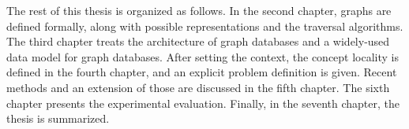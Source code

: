 The rest of this thesis is organized as follows.
In the second chapter, graphs are defined formally, along with possible representations and the traversal algorithms.
The third chapter treats the architecture of graph databases and a widely-used data model for graph databases.
After setting the context, the concept locality is defined in the fourth chapter, and an explicit problem definition is given.
Recent methods and an extension of those are discussed in the fifth chapter.
The sixth chapter presents the experimental evaluation.
Finally, in the seventh chapter, the thesis is summarized.
